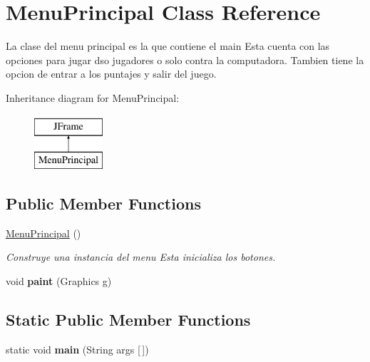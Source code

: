 \hypertarget{class_menu_principal}{}\section{Menu\+Principal Class Reference}
\label{class_menu_principal}


La clase del menu principal es la que contiene el main Esta cuenta con las opciones para jugar dso jugadores o solo contra la computadora. Tambien tiene la opcion de entrar a los puntajes y salir del juego.  


Inheritance diagram for Menu\+Principal\+:\begin{figure}[H]
\begin{center}
\leavevmode
\includegraphics[height=2.000000cm]{class_menu_principal}
\end{center}
\end{figure}
\subsection*{Public Member Functions}
\begin{DoxyCompactItemize}
\item 
\mbox{\label{class_menu_principal_abb574127c6a1e0ca6c56f68fc6bb18eb}} 
\mbox{\hyperlink{class_menu_principal_abb574127c6a1e0ca6c56f68fc6bb18eb}{Menu\+Principal}} ()
\begin{DoxyCompactList}\small\item\em Construye una instancia del menu Esta inicializa los botones. \end{DoxyCompactList}\item 
\mbox{\label{class_menu_principal_a68c852495f1ed76cb61f570af9ae7a52}} 
void {\bfseries paint} (Graphics g)
\end{DoxyCompactItemize}
\subsection*{Static Public Member Functions}
\begin{DoxyCompactItemize}
\item 
\mbox{\label{class_menu_principal_a9331983545333d10787f7bbe27dc3b1b}} 
static void {\bfseries main} (String args \mbox{[}$\,$\mbox{]})
\end{DoxyCompactItemize}


